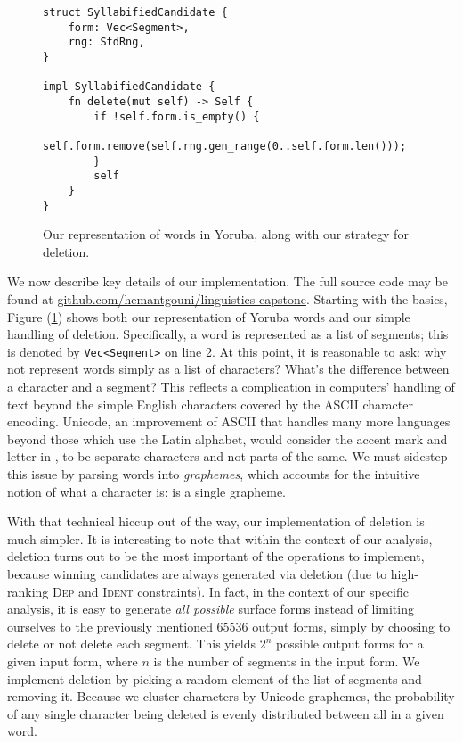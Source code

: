 \documentclass[12pt]{article}
\newcommand{\ident}{\textsc{Ident}}
\newcommand{\dep}{\textsc{Dep}}
\newcommand{\pref}[1]{(\ref{#1})}
\begin{document}
\begin{figure}[h]
\caption{Our representation of words in Yoruba, along with our strategy for deletion.}
\label{fig:impl-deletion}
\begin{verbatim}
struct SyllabifiedCandidate {
    form: Vec<Segment>,
    rng: StdRng,
}

impl SyllabifiedCandidate {
    fn delete(mut self) -> Self {
        if !self.form.is_empty() {
            self.form.remove(self.rng.gen_range(0..self.form.len()));
        }
        self
    }
}
\end{verbatim}
\end{figure}

We now describe key details of our implementation. The full source code may be
found at
\href{https://github.com/hemantgouni/linguistics-capstone}{github.com/hemantgouni/linguistics-capstone}.
Starting with the basics, Figure \pref{fig:impl-deletion} shows both our
representation of Yoruba words and our simple handling of deletion.
Specifically, a word is represented as a list of segments; this is denoted by
\texttt{Vec<Segment>} on line 2. At this point, it is reasonable to ask: why
not represent words simply as a list of characters? What's the difference
between a character and a segment? This reflects a complication in computers'
handling of text beyond the simple English characters covered by the ASCII
character encoding. Unicode, an improvement of ASCII that handles many more
languages beyond those which use the Latin alphabet, would consider the accent
mark and letter  in , to be separate characters and not
parts of the same. We must sidestep this issue by parsing words into
\textit{graphemes}, which accounts for the intuitive notion of what a character
is:  is a single grapheme.

With that technical hiccup out of the way, our implementation of deletion is
much simpler. It is interesting to note that within the context of our
analysis, deletion turns out to be the most important of the operations to
implement, because winning candidates are always generated via deletion (due to
high-ranking \dep{} and \ident{} constraints). In fact, in the context of our
specific analysis, it is easy to generate \textit{all possible} surface forms
instead of limiting ourselves to the previously mentioned 65536 output forms,
simply by choosing to delete or not delete each segment. This yields $2^n$
possible output forms for a given input form, where $n$ is the number of
segments in the input form. We implement deletion by picking a random element
of the list of segments and removing it. Because we cluster characters by
Unicode graphemes, the probability of any single character being deleted is
evenly distributed between all in a given word.
\end{document}
